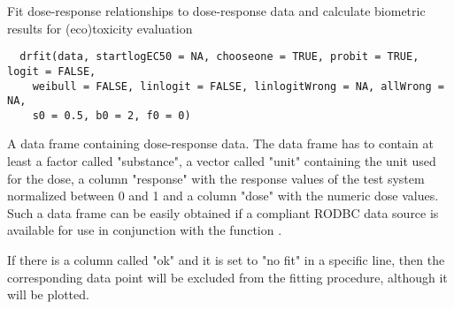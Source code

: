\begin{Description}\relax
Fit dose-response relationships to dose-response data and calculate
biometric results for (eco)toxicity evaluation
\end{Description}
\begin{Usage}
\begin{verbatim}
  drfit(data, startlogEC50 = NA, chooseone = TRUE, probit = TRUE, logit = FALSE,
    weibull = FALSE, linlogit = FALSE, linlogitWrong = NA, allWrong = NA, 
    s0 = 0.5, b0 = 2, f0 = 0)
\end{verbatim}
\end{Usage}
\begin{Arguments}
\begin{ldescription}
\item[\code{data}] A data frame containing dose-response data. The data frame has to
contain at least a factor called "substance", a vector called "unit"
containing the unit used for the dose, a column "response" with the
response values of the test system normalized between 0 and 1 and a column
"dose" with the numeric dose values. Such a data frame can be easily obtained
if a compliant RODBC data source is available for use in conjunction with 
the function .  

If there is a column called "ok" and it is set to "no fit" in a specific
line, then the corresponding data point will be excluded from the fitting
procedure, although it will be plotted.


\end{ldescription}
\end{Arguments}
